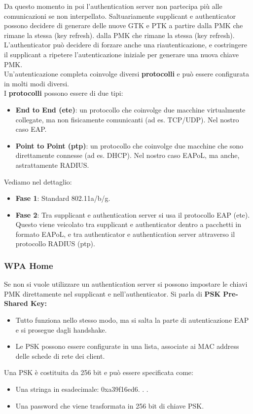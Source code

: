 \documentclass[12pt]{article}
\begin{document}
			 	Da questo momento in poi l’authentication server non partecipa più alle comunicazioni se non interpellato. Saltuariamente supplicant e authenticator possono decidere di generare delle nuove GTK e PTK a partire dalla PMK che rimane la stessa (key refresh). dalla PMK che rimane la stessa (key refresh). L’authenticator può decidere di forzare anche una riautenticazione, e costringere il supplicant a ripetere l’autenticazione iniziale per generare una nuova chiave PMK.\\
			 	Un’autenticazione completa coinvolge diversi\textbf{ protocolli} e può essere configurata in molti modi diversi.\\
			 	I \textbf{protocolli} possono essere di due tipi:
			 	\begin{itemize}
			 		\item \textbf{End to End (ete)}: un protocollo che coinvolge due macchine virtualmente collegate, ma non fisicamente
			 		comunicanti (ad es. TCP/UDP). Nel nostro caso EAP.
			 		\item \textbf{Point to Point (ptp)}: un protocollo che coinvolge due macchine che sono direttamente connesse (ad es.
			 		DHCP). Nel nostro caso EAPoL, ma anche, astrattamente RADIUS.
			 	\end{itemize}
		 		Vediamo nel dettaglio:
		 		\begin{itemize}
		 			\item \textbf{Fase 1}: Standard 802.11a/b/g.
		 			\item \textbf{Fase 2}: Tra supplicant e authentication server si usa il
		 			protocollo EAP (ete). Questo viene veicolato tra
		 			supplicant e authenticator dentro a pacchetti in
		 			formato EAPoL, e tra authenticator e
		 			authentication server attraverso il protocollo
		 			RADIUS (ptp).
		 		\end{itemize}
	 		\subsubsection{WPA Home}
	 			 Se non si vuole utilizzare un authentication server si
	 			possono impostare le chiavi PMK direttamente nel supplicant e nell’authenticator. Si parla di \textbf{PSK Pre-Shared Key:}
	 			\begin{itemize}
	 				\item Tutto funziona nello stesso modo, ma si salta la parte di autenticazione EAP e si prosegue dagli handshake.
	 				\item Le PSK possono essere configurate in una lista, associate
	 				ai MAC address delle schede di rete dei client.
	 			\end{itemize}
	 			Una PSK è costituita da 256 bit e può essere specificata come:
	 			\begin{itemize}
	 				\item Una stringa in esadecimale: 0xa39f16ed6. . .
	 				\item Una password che viene trasformata in 256 bit di chiave
	 				PSK.
	 			\end{itemize}
 			
\end{document}

